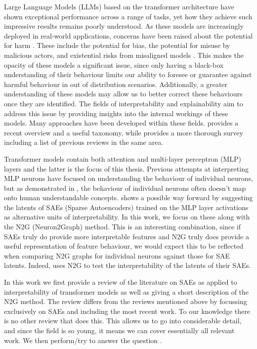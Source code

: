 Large Language Models (LLMs) based on the transformer architecture \parencite{vaswani_attention_2023} have shown exceptional performance across a range of tasks, yet how they achieve such impressive results remains poorly understood.
As these models are increasingly deployed in real-world applications, concerns have been raised about the potential for harm \parencite{noauthor_statement_nodate}\parencite{hendrycks_overview_2023}.
These include the potential for bias, the potential for misuse by malicious actors, and existential risks from misaligned models \parencite{ngo_alignment_2024}.
This makes the opacity of these models a significant issue, since only having a black-box understanding of their behaviour limits our ability to foresee or guarantee against harmful behaviour in out of distribution scenarios.
Additionally, a greater understanding of these models may allow us to better correct these behaviours once they are identified.
The fields of interpretability and explainability aim to address this issue by providing insights into the internal workings of these models.
Many approaches have been developed within these fields.
\textcite{bereska_mechanistic_2024} provides a recent overview and a useful taxonomy, while \textcite{rauker_toward_2023} provides a more thorough survey including a list of previous reviews in the same area.

Transformer models contain both attention and multi-layer perceptron (MLP) layers and the latter is the focus of this thesis.
Previous attempts at interpreting MLP neurons have focused on understanding the behaviour of individual neurons\parencite{wang_interpretability_2022}, but as demonstrated in \textcite{elhage_toy_2022}, the behaviour of individual neurons often doesn't map onto human understandable concepts.
\textcite{bricken_towards_2023} shows a possible way forward by suggesting the latents of SAEs (Sparse Autoencoders) trained on the MLP layer activations as alternative units of interpretability.
In this work, we focus on these along with the N2G (Neuron2Graph) \parencite{foote_neuron_2023} method.
This is an interesting combination, since if SAEs truly do provide more interpretable features and N2G truly does provide a useful representation of feature behaviour, we would expect this to be reflected when comparing N2G graphs for individual neurons against those for SAE latents.
Indeed, \textcite{gao_scaling_2024} uses N2G to test the interpretability of the latents of their SAEs.

In this work we first provide a review of the literature on SAEs as applied to interpretability of transformer models as well as giving a short description of the N2G method.
The review differs from the reviews mentioned above by focussing exclusively on SAEs and including the most recent work.
To our knowledge there is no other review that does this.
This allows us to go into considerable detail, and since the field is so young, it means we can cover essentially all relevant work.
We then perform/try to answer the question .

